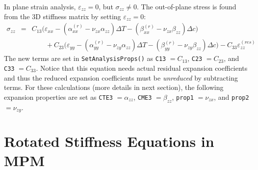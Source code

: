 \documentclass[11pt]{book}
\def\a#1{\alpha_{#1}}
\def\b#1{\beta_{#1}}
\def\code#1{{\small\tt #1}}
\def\DT{\Delta T}
\def\e#1{\varepsilon_{#1}}
\def\er#1{\varepsilon_{#1}^{(res)}}
\def\s#1{\sigma_{#1}}
\def\v#1{\nu_{#1}}
\begin{document}
In plane strain analysis, $\e{zz}=0$, but $\s{zz}\ne0$. The out-of-plane stress is found from the 3D stiffness matrix by setting $\e{zz}=0$:
\begin{eqnarray}
            \s{zz} & = & C_{13}\bigl(\e{xx} -(\a{xx}^{(r)}-\v{zx}\a{zz})\DT - (\b{xx}^{(r)}-\v{zx}\b{zz})\Delta c\bigr)
 \nonumber\\
 &&\qquad\mbox{}
                     +C_{23}\bigl(\e{yy} -(\a{yy}^{(r)}-\v{zy}\a{zz})\DT-(\b{yy}^{(r)}-\v{zy}\b{zz})\Delta c\bigr) 
                     -C_{33} \er{zz}
\end{eqnarray}
The new terms are set in \code{SetAnalysisProps()} as \code{C13} $=C_{13}$, \code{C23} $=C_{23}$, and \code{C33} $=C_{33}$. Notice that this equation needs actual residual expansion coefficients and thus the reduced expansion coefficients must be {\em unreduced} by subtracting terms. For these calculations (more details in next section), the following expansion properties are set as \code{CTE3} $=\a{zz}$, \code{CME3} $=\b{zz}$, \code{prop1} $=\v{zx}$, and \code{prop2} $=\v{zy}$.

\section{Rotated Stiffness Equations in MPM}
\end{document}
